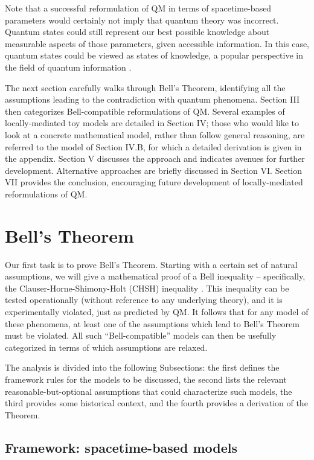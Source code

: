 \documentclass[onecolumn, nofootinbib, 12pt]{revtex4-1}
\begin{document}
Note that a successful reformulation of QM in terms of spacetime-based parameters would certainly not imply that quantum theory was incorrect.  Quantum states could still represent our best possible knowledge about measurable aspects of those parameters, given accessible information.  In this case, quantum states could be viewed as states of knowledge, a popular perspective in the field of quantum information \cite{caves2002,spekkens2007,leifer2013}.

The next section carefully walks through Bell's Theorem, identifying all the assumptions leading to the contradiction with quantum phenomena.  Section III then categorizes Bell-compatible reformulations of QM.  Several examples of locally-mediated toy models are detailed in Section IV; those who would like to look at a concrete mathematical model, rather than follow general reasoning, are referred to the model of Section IV.B, for which a detailed derivation is given in the appendix.  Section V discusses the approach and indicates avenues for further development.  Alternative approaches are briefly discussed in Section VI\@.  Section VII provides the conclusion, encouraging future development of locally-mediated reformulations of QM.


\section{Bell's Theorem}

Our first task is to prove Bell's Theorem.  Starting with a certain set of natural assumptions, we will give a mathematical proof of a Bell inequality -- specifically, the Clauser-Horne-Shimony-Holt (CHSH) inequality \cite{clauser1969}.  This inequality can be tested operationally (without reference to any underlying theory), and it is experimentally violated, just as predicted by QM.  It follows that for any model of these phenomena, at least one of the assumptions which lead to Bell's Theorem must be violated.  All such ``Bell-compatible'' models can then be usefully categorized in terms of which assumptions are relaxed.  

The analysis is divided into the following Subsections: the first defines the framework rules for the models to be discussed, the second lists the relevant reasonable-but-optional assumptions that could characterize such models, the third provides some historical context, and the fourth provides a derivation of the Theorem. 

\subsection{Framework: spacetime-based models}
\label{sec:framework}
\end{document}
